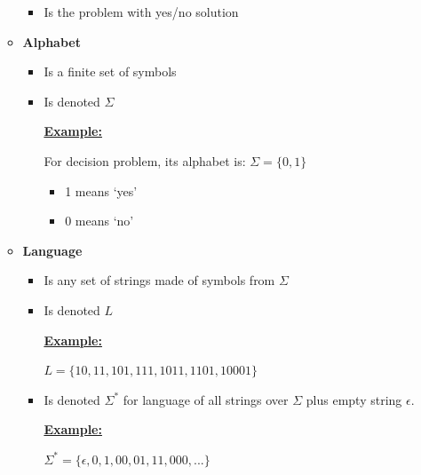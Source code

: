 \documentclass[12pt]{article}
\begin{document}
\begin{enumerate}[1.]
\begin{itemize}
        \begin{itemize}
            \item Is the problem with yes/no solution
        \end{itemize}

        \bigskip

        \item \textbf{Alphabet}

        \begin{itemize}
            \item Is a finite set of symbols
            \item Is denoted $\Sigma$

            \bigskip

            \underline{\textbf{Example:}}

            \bigskip

            For decision problem, its alphabet is: $\Sigma = \{0,1\}$

            \begin{itemize}
                \item 1 means `yes'
                \item 0 means `no'
            \end{itemize}
        \end{itemize}

        \item \textbf{Language}

        \begin{itemize}
            \item Is any set of strings made of symbols from $\Sigma$
            \item Is denoted $L$

            \bigskip

            \underline{\textbf{Example:}}

            \bigskip

            $L = \{10,11,101,111,1011,1101,10001\}$

            \bigskip

            \item Is denoted $\Sigma^*$ for language of all strings over $\Sigma$ plus empty string $\epsilon$.

            \bigskip

            \underline{\textbf{Example:}}

            \bigskip

            $\Sigma^* = \{\epsilon, 0,1,00,01,11,000,...\}$


\end{itemize}
\end{itemize}
\end{enumerate}
\end{document}
